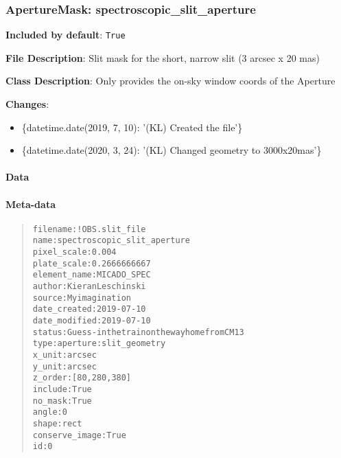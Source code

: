 \subsubsection{ApertureMask: \textquotedbl{}spectroscopic\_slit\_aperture\textquotedbl{}%
  \label{aperturemask-spectroscopic-slit-aperture}%
}

\textbf{Included by default}: \texttt{True}

\textbf{File Description}: Slit mask for the short, narrow slit (3 arcsec x 20 mas)

\textbf{Class Description}: Only provides the on-sky window coords of the Aperture

\textbf{Changes}:

\begin{itemize}
\item \{datetime.date(2019, 7, 10): '(KL) Created the file'\}

\item \{datetime.date(2020, 3, 24): '(KL) Changed geometry to 3000x20mas'\}
\end{itemize}


\paragraph{Data%
  \label{id1}%
}


\paragraph{Meta-data%
  \label{id2}%
}

\begin{quote}
\begin{alltt}
      filename : !OBS.slit_file
          name : spectroscopic_slit_aperture
   pixel_scale : 0.004
   plate_scale : 0.2666666667
  element_name : MICADO_SPEC
        author : Kieran Leschinski
        source : My imagination
  date_created : 2019-07-10
 date_modified : 2019-07-10
        status : Guess - in the train on the way home from CM13
          type : aperture:slit_geometry
        x_unit : arcsec
        y_unit : arcsec
       z_order : [80, 280, 380]
       include : True
       no_mask : True
         angle : 0
         shape : rect
conserve_image : True
            id : 0
\end{alltt}
\end{quote}


